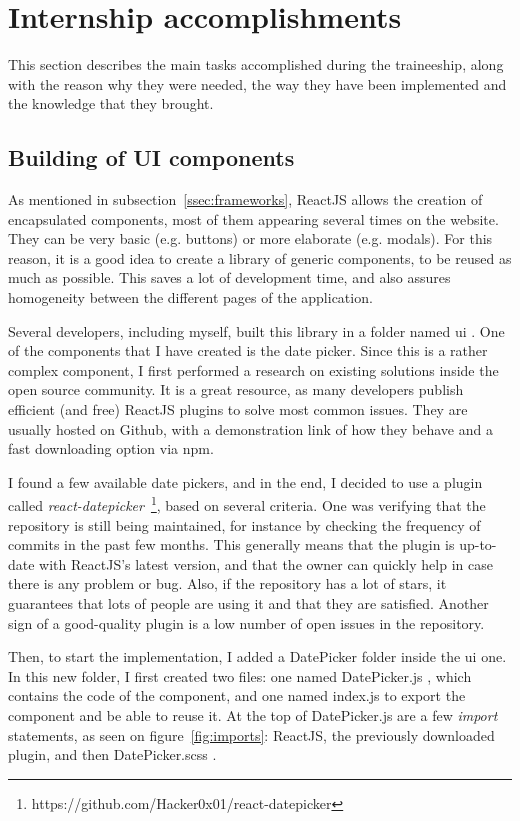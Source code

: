 \section{Internship accomplishments}
\label{sec:accomplish}

This section describes the main tasks accomplished during the traineeship, along with the reason why they were needed, the way they have been implemented and the knowledge that they brought.

\subsection{Building of UI components}
\label{ssec:ui_components}

As mentioned in {\sc subsection}~\ref{ssec:frameworks}, ReactJS allows the creation of encapsulated components, most of them appearing several times on the website. They can be very basic (e.g. buttons) or more elaborate (e.g. modals). For this reason, it is a good idea to create a library of generic components, to be reused as much as possible. This saves a lot of development time, and also assures homogeneity between the different pages of the application.

Several developers, including myself, built this library in a folder named \guillemotleft{} ui \guillemotright{}. One of the components that I have created is the date picker. Since this is a rather complex component, I first performed a research on existing solutions inside the open source community. It is a great resource, as many developers publish efficient (and free) ReactJS plugins to solve most common issues. They are usually hosted on Github, with a demonstration link of how they behave and a fast downloading option via npm.

I found a few available date pickers, and in the end, I decided to use a plugin called \textit{react-datepicker}~\footnote{https://github.com/Hacker0x01/react-datepicker}, based on several criteria. One was verifying that the repository is still being maintained, for instance by checking the frequency of commits in the past few months. This generally means that the plugin is up-to-date with ReactJS's latest version, and that the owner can quickly help in case there is any problem or bug. Also, if the repository has a lot of stars, it guarantees that lots of people are using it and that they are satisfied. Another sign of a good-quality plugin is a low number of open issues in the repository. 

Then, to start the implementation, I added a \guillemotleft{} DatePicker \guillemotright{} folder inside the ui one. In this new folder, I first created two files: one named \guillemotleft{} DatePicker.js \guillemotright{}, which contains the code of the component, and one named \guillemotleft{} index.js \guillemotright{} to export the component and be able to reuse it. At the top of DatePicker.js are a few \textit{import} statements, as seen on {\sc figure}~\ref{fig:imports}: ReactJS, the previously downloaded plugin, and then \guillemotleft{} DatePicker.scss \guillemotright{}.

